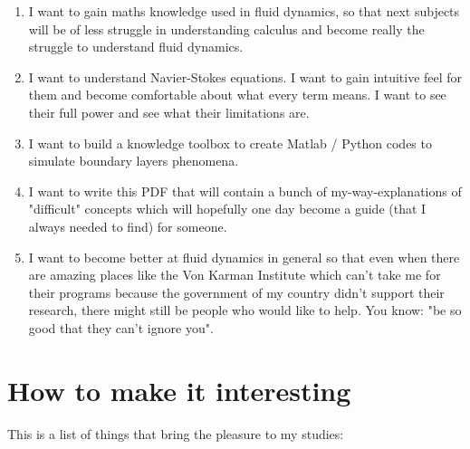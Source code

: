 \documentclass[12pt]{report}
\begin{document}
\begin{enumerate}

\item I want to gain maths knowledge used in fluid dynamics, so that next subjects will be of less struggle in understanding calculus and become really the struggle to understand fluid dynamics.

\item I want to understand Navier-Stokes equations. I want to gain intuitive feel for them and become comfortable about what every term means. I want to see their full power and see what their limitations are.

\item I want to build a knowledge toolbox to create Matlab / Python codes to simulate boundary layers phenomena.

\item I want to write this PDF that will contain a bunch of my-way-explanations of "difficult" concepts which will hopefully one day become a guide (that I always needed to find) for someone.

\item I want to become better at fluid dynamics in general so that even when there are amazing places like the Von Karman Institute which can't take me for their programs because the government of my country didn't support their research, there might still be people who would like to help. You know: "be so good that they can't ignore you".

\end{enumerate}



\section{How to make it interesting} \label{chap:interesting}

This is a list of things that bring the pleasure to my studies:
\end{document}
